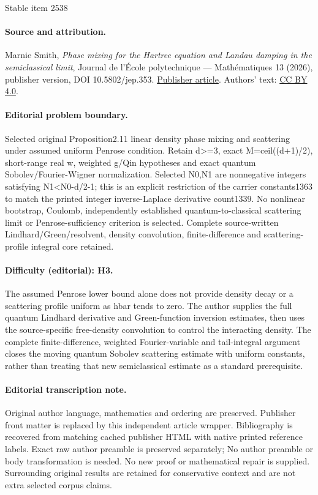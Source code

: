 \documentclass[11pt]{article}
\theoremstyle{plain}
\theoremstyle{remark}
\begin{document}
\begin{center}{\Large Stable item 2538}\end{center}
\paragraph{Source and attribution.}
Marnie Smith, \emph{Phase mixing for the Hartree equation and Landau damping in the semiclassical limit}, Journal de l’École polytechnique — Mathématiques 13 (2026), publisher version, DOI 10.5802/jep.353. \href{https://jep.centre-mersenne.org/articles/10.5802/jep.353/}{Publisher article}. Authors' text: \href{https://creativecommons.org/licenses/by/4.0/}{CC BY 4.0}.
\paragraph{Editorial problem boundary.}
Selected original Proposition2.11 linear density phase mixing and scattering under assumed uniform Penrose condition. Retain d>=3, exact M=ceil((d+1)/2), short-range real w, weighted g/Qin hypotheses and exact quantum Sobolev/Fourier-Wigner normalization. Selected N0,N1 are nonnegative integers satisfying N1<N0-d/2-1; this is an explicit restriction of the carrier constants1363 to match the printed integer inverse-Laplace derivative count1339. No nonlinear bootstrap, Coulomb, independently established quantum-to-classical scattering limit or Penrose-sufficiency criterion is selected. Complete source-written Lindhard/Green/resolvent, density convolution, finite-difference and scattering-profile integral core retained.
\paragraph{Difficulty (editorial): H3.}
The assumed Penrose lower bound alone does not provide density decay or a scattering profile uniform as hbar tends to zero. The author supplies the full quantum Lindhard derivative and Green-function inversion estimates, then uses the source-specific free-density convolution to control the interacting density. The complete finite-difference, weighted Fourier-variable and tail-integral argument closes the moving quantum Sobolev scattering estimate with uniform constants, rather than treating that new semiclassical estimate as a standard prerequisite.
\paragraph{Editorial transcription note.}
Original author language, mathematics and ordering are preserved. Publisher front matter is replaced by this independent article wrapper. Bibliography is recovered from matching cached publisher HTML with native printed reference labels. Exact raw author preamble is preserved separately; No author preamble or body transformation is needed. No new proof or mathematical repair is supplied. Surrounding original results are retained for conservative context and are not extra selected corpus claims.
\clearpage
\end{document}
